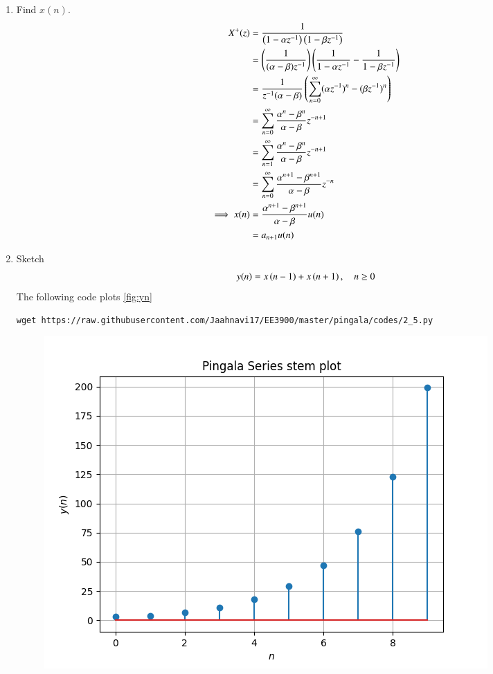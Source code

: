 \documentclass[journal,12pt,twocolumn]{IEEEtran}
\renewcommand\thesection{\arabic{section}}
\begin{document}
\begin{enumerate}[label=\thesection.\arabic*,ref=\thesection.\theenumi]
	\item Find $x(n)$.
	\begin{align}
	    X^{+}(z)    &= \frac{1}{\left(1-\alpha z^{-1}\right) \left(1-\beta z^{-1}\right)}\\
	    &=\left(\frac{1}{(\alpha-\beta)z^{-1}}\right)\left(\frac{1}{1-\alpha z^{-1}} - \frac{1}{1-\beta z^{-1}} \right)\\
	    &=\frac{1}{z^{-1}(\alpha-\beta)}\left(\sum_{n=0}^\infty (\alpha z^{-1})^n-(\beta z^{-1})^n \right)\\
	    &= \sum_{n=0}^\infty \frac{\alpha^n-\beta^n}{\alpha-\beta}z^{-n+1}\\
	    &= \sum_{n=1}^\infty \frac{\alpha^n-\beta^n}{\alpha-\beta}z^{-n+1}\\
	    &= \sum_{n=0}^\infty \frac{\alpha^{n+1}-\beta^{n+1}}{\alpha-\beta}z^{-n}\\
	    \implies x(n) &= \frac{\alpha^{n+1}-\beta^{n+1}}{\alpha-\beta}u(n)\\
	    &=a_{n+1}u(n)\label{eq:xn}
	\end{align}
	\item Sketch 
\begin{align}
	y(n)	 = x\left(n-1\right) + x\left(n+1\right),  \quad n \ge 0
	\label{eq:10-orig-diff-rev}
\end{align}
 \solution The following code plots \ref{fig:yn}
	    \begin{lstlisting}
wget https://raw.githubusercontent.com/Jaahnavi17/EE3900/master/pingala/codes/2_5.py
\end{lstlisting}
\begin{figure}
    \centering
    \includegraphics[width=\columnwidth]{figures/2_5.png}

\end{figure}
\end{enumerate}
\end{document}
